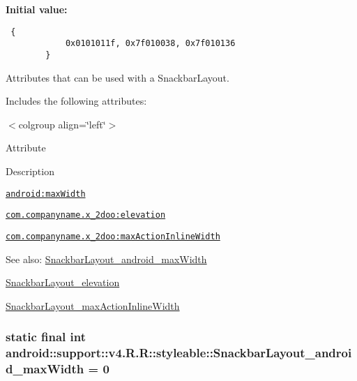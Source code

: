 \textbf{Initial value:}

\begin{Code}\begin{verbatim} {
            0x0101011f, 0x7f010038, 0x7f010136
        }
\end{verbatim}
\end{Code}
Attributes that can be used with a SnackbarLayout. 

Includes the following attributes: \begin{TabularC}{0}
\hline
\end{TabularC}
$<$colgroup align=\char`\"{}left\char`\"{}$>$ 

Attribute

Description 

{\tt \hyperlink{classandroid_1_1support_1_1v4_1_1_r_1_1styleable_9291e55de0c3f166cbb4305f9cfa38e9}{android:maxWidth}}

{\tt \hyperlink{classandroid_1_1support_1_1v4_1_1_r_1_1styleable_b3f175a59ff6b35450d8d3ec1d9a90ac}{com.companyname.x\_\-2doo:elevation}}

{\tt \hyperlink{classandroid_1_1support_1_1v4_1_1_r_1_1styleable_4e91b05c2e5aec649db0d92316818e0c}{com.companyname.x\_\-2doo:maxActionInlineWidth}}

\begin{Desc}
\item[See also:]\hyperlink{classandroid_1_1support_1_1v4_1_1_r_1_1styleable_9291e55de0c3f166cbb4305f9cfa38e9}{SnackbarLayout\_\-android\_\-maxWidth} 

\hyperlink{classandroid_1_1support_1_1v4_1_1_r_1_1styleable_b3f175a59ff6b35450d8d3ec1d9a90ac}{SnackbarLayout\_\-elevation} 

\hyperlink{classandroid_1_1support_1_1v4_1_1_r_1_1styleable_4e91b05c2e5aec649db0d92316818e0c}{SnackbarLayout\_\-maxActionInlineWidth} \end{Desc}
\hypertarget{classandroid_1_1support_1_1v4_1_1_r_1_1styleable_9291e55de0c3f166cbb4305f9cfa38e9}{
\subsubsection[{SnackbarLayout\_\-android\_\-maxWidth}]{\setlength{\rightskip}{0pt plus 5cm}static final int android::support::v4.R.R::styleable::SnackbarLayout\_\-android\_\-maxWidth = 0}}
\label{classandroid_1_1support_1_1v4_1_1_r_1_1styleable_9291e55de0c3f166cbb4305f9cfa38e9}


